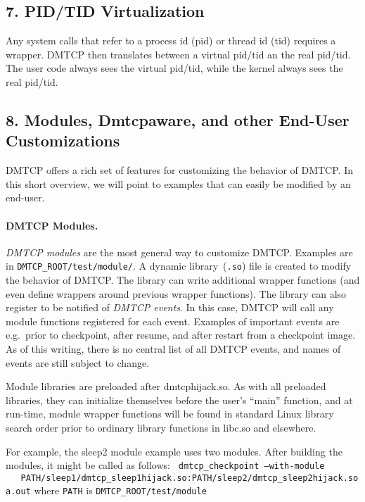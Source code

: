 \documentclass{article}
\begin{document}
\subsection*{7. PID/TID Virtualization}

Any system calls that refer to a process id (pid) or thread id (tid) requires
a wrapper.  DMTCP then translates between a virtual pid/tid an the
real pid/tid.  The user code always sees the virtual pid/tid, while
the kernel always sees the real pid/tid.

\newpage

\subsection*{8. Modules, Dmtcpaware, and other End-User Customizations}

DMTCP offers a rich set of features for customizing the behavior of
DMTCP.  In this short overview, we will point to examples that can
easily be modified by an end-user.

\paragraph{DMTCP Modules.}

{\em DMTCP modules\/} are the most general way to customize DMTCP.  Examples
are in {\tt DMTCP\_ROOT/test/module/}.  A dynamic library~({\tt *.so})
file is created to modify the behavior of DMTCP.  The library can
write additional wrapper functions (and even define wrappers around
previous wrapper functions).  The library can also register
to be notified of {\em DMTCP events}.  In this case, DMTCP will
call any module functions registered for each event.
Examples of important events are
\hbox{e.g.}~prior to checkpoint, after resume, and after restart
from a checkpoint image.  As of this writing, there is no central
list of all DMTCP events, and names of events are still subject to change.

Module libraries are preloaded after dmtcphijack.so.  As with all
preloaded libraries, they can initialize themselves before the user's
``main'' function, and at run-time, module wrapper functions will
be found in standard Linux library search order prior to ordinary
library functions in libc.so and elsewhere.

For example, the sleep2 module example uses two modules.  After building
the modules, it might be called as follows: 
{\tt
  dmtcp\_checkpoint --with-module \\ \newline
\hbox{\ \ }
 PATH/sleep1/dmtcp\_sleep1hijack.so:PATH/sleep2/dmtcp\_sleep2hijack.so a.out}
 \newline
where {\tt PATH} is {\tt DMTCP\_ROOT/test/module}
\end{document}
